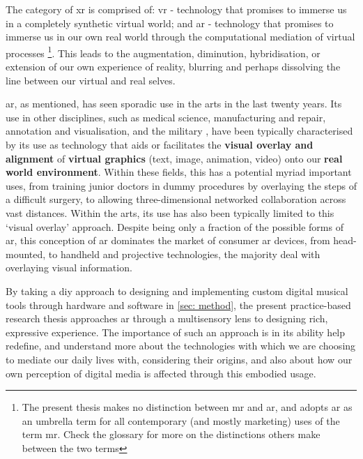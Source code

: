 The category of \gls{xr} is comprised of: \gls{vr} - technology that promises to immerse us in a completely synthetic virtual world; and \gls{ar} - technology that promises to immerse us in our own real world through the computational mediation of virtual processes \footnote{The present thesis makes no distinction between \gls{mr} and \gls{ar}, and adopts \gls{ar} as an umbrella term for all contemporary (and mostly marketing) uses of the term \gls{mr}. Check the glossary for more on the distinctions others make between the two terms}. This leads to the augmentation, diminution, hybridisation, or extension of our own experience of reality, blurring and perhaps dissolving the line between our virtual and real selves.

\gls{ar}, as mentioned, has seen sporadic use in the arts in the last twenty years. Its use in other disciplines, such as medical science, manufacturing and repair, annotation and visualisation, and the military \citep{azuma1997}, have been typically characterised by its use as technology that aids or facilitates the \textbf{visual overlay and alignment} of \textbf{virtual graphics} (text, image, animation, video) onto our \textbf{real world environment}. Within these fields, this has a potential myriad important uses, from training junior doctors in dummy procedures by overlaying the steps of a difficult surgery, to allowing three-dimensional networked collaboration across vast distances. Within the arts, its use has also been typically limited to this `visual overlay' approach. Despite being only a fraction of the possible forms of \gls{ar}, this conception of \gls{ar} dominates the market of consumer \gls{ar} devices, from head-mounted, to handheld and projective technologies, the majority deal with overlaying visual information. 

By taking a \gls{diy} approach to designing and implementing custom digital musical tools through hardware and software in \autoref{sec: method}, the present practice-based research thesis approaches \gls{ar} through a multisensory lens to designing rich, expressive experience. The importance of such an approach is in its ability help redefine, and understand more about the technologies with which we are choosing to mediate our daily lives with, considering their origins, and also about how our own perception of digital media is affected through this embodied usage. 



